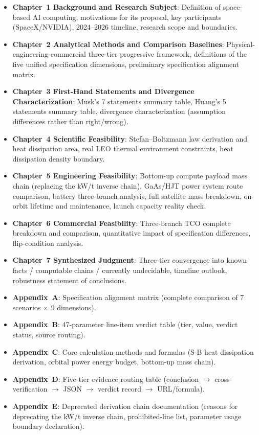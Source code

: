 \begin{itemize}[leftmargin=*]
    \item \textbf{Chapter~1 Background and Research Subject}: Definition of space-based AI computing, motivations for its proposal, key participants (SpaceX/NVIDIA), 2024--2026 timeline, research scope and boundaries.
    \item \textbf{Chapter~2 Analytical Methods and Comparison Baselines}: Physical-engineering-commercial three-tier progressive framework, definitions of the five unified specification dimensions, preliminary specification alignment matrix.
    \item \textbf{Chapter~3 First-Hand Statements and Divergence Characterization}: Musk's 7 statements summary table, Huang's 5 statements summary table, divergence characterization (assumption differences rather than right/wrong).
    \item \textbf{Chapter~4 Scientific Feasibility}: Stefan--Boltzmann law derivation and heat dissipation area, real LEO thermal environment constraints, heat dissipation density boundary.
    \item \textbf{Chapter~5 Engineering Feasibility}: Bottom-up compute payload mass chain (replacing the kW/t inverse chain), GaAs/HJT power system route comparison, battery three-branch analysis, full satellite mass breakdown, on-orbit lifetime and maintenance, launch capacity reality check.
    \item \textbf{Chapter~6 Commercial Feasibility}: Three-branch TCO complete breakdown and comparison, quantitative impact of specification differences, flip-condition analysis.
    \item \textbf{Chapter~7 Synthesized Judgment}: Three-tier convergence into known facts / computable chains / currently undecidable, timeline outlook, robustness statement of conclusions.
    \item \textbf{Appendix~A}: Specification alignment matrix (complete comparison of 7 scenarios $\times$ 9 dimensions).
    \item \textbf{Appendix~B}: 47-parameter line-item verdict table (tier, value, verdict status, source routing).
    \item \textbf{Appendix~C}: Core calculation methods and formulas (S-B heat dissipation derivation, orbital power energy budget, bottom-up mass chain).
    \item \textbf{Appendix~D}: Five-tier evidence routing table (conclusion $\to$ cross-verification $\to$ JSON $\to$ verdict record $\to$ URL/formula).
    \item \textbf{Appendix~E}: Deprecated derivation chain documentation (reasons for deprecating the kW/t inverse chain, prohibited-line list, parameter usage boundary declaration).
\end{itemize}

